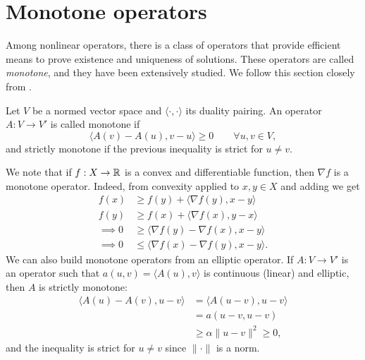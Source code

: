 \section{Monotone operators}
Among nonlinear operators, there is a class of operators that provide efficient means to prove existence and uniqueness of solutions. These operators are called \textit{monotone}, and they have been extensively studied. We follow this section closely from \cite{ciarlet2013linear}.
\begin{definition}
    Let $V$ be a normed vector space and $\langle\cdot,\cdot\rangle$ its duality pairing. An operator $A:V\to V'$ is called monotone if
    \begin{equation*}
        \langle A(v)-A(u),v-u\rangle \geq 0 \qquad \forall u,v\in V,
    \end{equation*}
    and strictly monotone if the previous inequality is strict for $u\neq v$.
\end{definition}
We note that if $f:X\to \mathbb{R}$ is a convex and differentiable function, then $\nabla f$ is a monotone operator. Indeed, from convexity applied to $x,y\in X$ and adding we get
\begin{align*}
    f(x) &\geq f(y) + \langle \nabla f(y), x-y\rangle\\
    f(y) &\geq f(x) + \langle \nabla f(x), y-x\rangle\\
    \implies 0 &\geq \langle \nabla f(y)-\nabla f(x),x-y\rangle \\
    \implies 0&\leq \langle \nabla f(x)-\nabla f(y),x-y\rangle.
\end{align*}
We can also build monotone operators from an elliptic operator. If $A:V\to V'$ is an operator such that $a(u,v) = \langle A(u),v\rangle$ is continuous (linear) and elliptic, then $A$ is strictly monotone:
\begin{align*}
    \langle A(u)-A(v),u-v\rangle &= \langle A(u-v), u-v\rangle\\
    &= a(u-v,u-v)\\
    &\geq \alpha \|u-v\|^2 \geq 0,
\end{align*}
and the inequality is strict for $u\neq v$ since $\|\cdot\|$ is a norm. 

